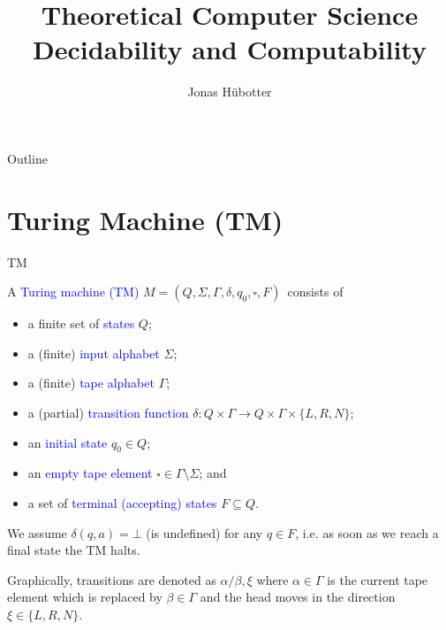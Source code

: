 \documentclass{beamer}
\title[Theoretical Computer Science]{Theoretical Computer Science \\ Decidability and Computability}
\author{Jonas Hübotter}
\date{}
\theoremstyle{definition}
\def\b{\textcolor{blue}}
\begin{document}
\begin{frame}
  \titlepage
\end{frame}

\begin{frame}[allowframebreaks]{Outline}
 \tableofcontents[subsubsectionstyle=hide]
\end{frame}

\section{Turing Machine (TM)}

\begin{frame}{TM}
    \begin{definition}
        A \b{Turing machine (TM)} $M = (Q, \Sigma, \Gamma, \delta, q_0, \square, F)$\pause\ consists of
        \begin{itemize}
            \item a finite set of \b{states} $Q$\pause;
            \item a (finite) \b{input alphabet} $\Sigma$\pause;
            \item a (finite) \b{tape alphabet} $\Gamma$\pause;
            \item a (partial) \b{transition function} $\delta: Q \times \Gamma \to Q \times \Gamma \times \{L,R,N\}$\pause;
            \item an \b{initial state} $q_0 \in Q$\pause;
            \item an \b{empty tape element} $\square \in \Gamma \setminus \Sigma$\pause; and
            \item a set of \b{terminal (accepting) states} $F \subseteq Q$.
        \end{itemize}
    \end{definition}\pause
    We assume $\delta(q, a) = \bot$ (is undefined) for any $q \in F$, i.e. as soon as we reach a final state the TM halts.\pause\par
    Graphically, transitions are denoted as $\alpha/\beta, \xi$ where $\alpha \in \Gamma$ is the current tape element which is replaced by $\beta \in \Gamma$ and the head moves in the direction $\xi \in \{L,R,N\}$.
\end{frame}
\end{document}
